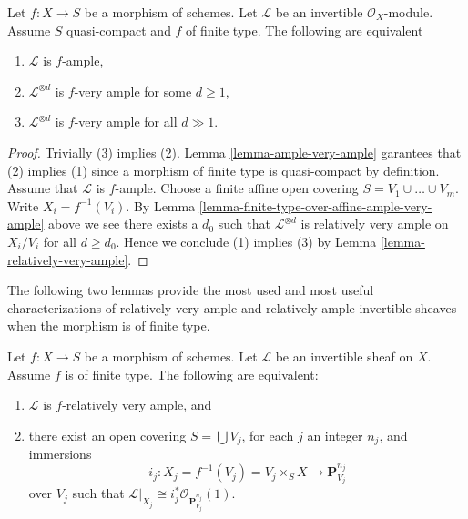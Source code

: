 \begin{lemma}
\label{lemma-finite-type-ample-very-ample}
Let $f : X \to S$ be a morphism of schemes.
Let $\mathcal{L}$ be an invertible $\mathcal{O}_X$-module.
Assume $S$ quasi-compact and $f$ of finite type.
The following are equivalent
\begin{enumerate}
\item $\mathcal{L}$ is $f$-ample,
\item $\mathcal{L}^{\otimes d}$ is $f$-very ample for some $d \geq 1$,
\item $\mathcal{L}^{\otimes d}$ is $f$-very ample for all $d \gg 1$.
\end{enumerate}
\end{lemma}

\begin{proof}
Trivially (3) implies (2). Lemma \ref{lemma-ample-very-ample} garantees that
(2) implies (1) since a morphism of finite type is quasi-compact
by definition. Assume that $\mathcal{L}$ is $f$-ample. Choose a finite affine
open covering $S = V_1 \cup \ldots \cup V_m$. Write $X_i = f^{-1}(V_i)$.
By Lemma \ref{lemma-finite-type-over-affine-ample-very-ample} above we see
there exists a $d_0$ such that $\mathcal{L}^{\otimes d}$ is
relatively very ample on $X_i/V_i$ for all $d \geq d_0$. Hence we conclude
(1) implies (3) by Lemma \ref{lemma-relatively-very-ample}.
\end{proof}

\noindent
The following two lemmas provide the most used and most useful
characterizations of relatively very ample and relatively ample
invertible sheaves when the morphism is of finite type.

\begin{lemma}
\label{lemma-characterize-very-ample-on-finite-type}
Let $f : X \to S$ be a morphism of schemes.
Let $\mathcal{L}$ be an invertible sheaf on $X$.
Assume $f$ is of finite type.
The following are equivalent:
\begin{enumerate}
\item $\mathcal{L}$ is $f$-relatively very ample, and
\item there exist an open covering $S = \bigcup V_j$,
for each $j$ an integer $n_j$, and immersions
$$
i_j :
X_j = f^{-1}(V_j) = V_j \times_S X
\longrightarrow
\mathbf{P}^{n_j}_{V_j}
$$
over $V_j$ such that
$\mathcal{L}|_{X_j} \cong i_j^*\mathcal{O}_{\mathbf{P}^{n_j}_{V_j}}(1)$.
\end{enumerate}
\end{lemma}

